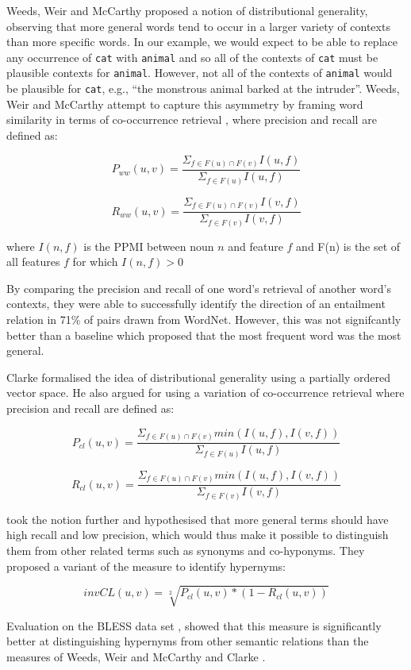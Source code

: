 \documentclass[11pt]{article}
\begin{document}
Weeds, Weir and McCarthy  proposed a notion of distributional generality, observing that more general words tend to occur in a larger variety of contexts than more specific words.  In our example, we would expect to be able to replace any occurrence of \texttt{cat} with \texttt{animal} and so all of the contexts of \texttt{cat} must be plausible contexts for \texttt{animal}.  However, not all of the contexts of \texttt{animal} would be plausible for \texttt{cat}, e.g., ``the monstrous animal barked at the intruder''.  Weeds, Weir and McCarthy attempt to capture this asymmetry by framing word similarity in terms of co-occurrence retrieval \cite{Weeds2003}, where precision and recall are defined as:

\[
P_{ww}(u,v) = \frac{\Sigma_{f \in F(u) \cap F(v)} I(u,f)}{\Sigma_{f \in F(u)} I(u,f)}
\]

\[
R_{ww}(u,v) = \frac{\Sigma_{f \in F(u) \cap F(v)} I(v,f)}{\Sigma_{f \in F(v)} I(v,f)}
\]

where $I(n,f)$ is the PPMI between noun $n$ and feature $f$ and F(n) is the set of all features $f$ for which $I(n,f)>0$

By comparing the precision and recall of one word's retrieval of another word's contexts, they were able to successfully identify the direction of an entailment relation in 71\% of pairs drawn from WordNet.  However, this was not signifcantly better than a baseline which proposed that the most frequent word was the most general.

Clarke  formalised the idea of distributional generality using a partially ordered vector space.  He also argued for using a variation of co-occurrence retrieval where precision and recall are defined as:

\[
P_{cl}(u,v) = \frac{\Sigma_{f \in F(u) \cap F(v)} min(I(u,f),I(v,f))}{\Sigma_{f \in F(u)} I(u,f)}
\]

\[
R_{cl}(u,v) = \frac{\Sigma_{f \in F(u) \cap F(v)} min(I(u,f),I(v,f))}{\Sigma_{f \in F(v)} I(v,f)}
\]

 took the notion further and hypothesised that more general terms should have high recall and low precision, which would thus make it possible to distinguish them from other related terms such as synonyms and co-hyponyms.  They proposed a variant of the  measure to identify hypernyms:

\[
invCL(u,v) = \sqrt[2]{P_{cl}(u,v)*(1-R_{cl}(u,v))}
\]

Evaluation on the BLESS data set \cite{Baroni2011}, showed that this measure is significantly better at distinguishing hypernyms from other semantic relations than the measures of Weeds, Weir and McCarthy  and Clarke .
\end{document}
